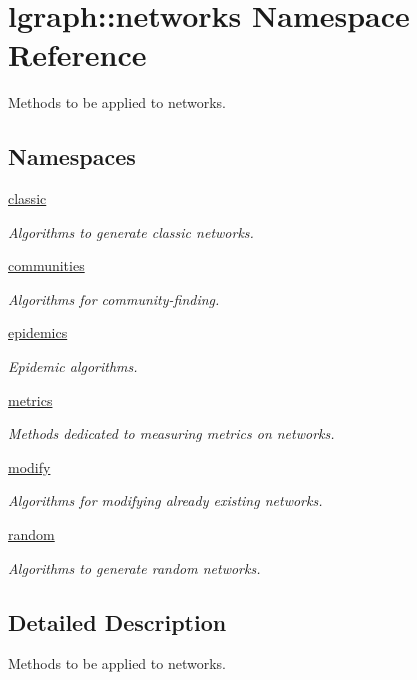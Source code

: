 \hypertarget{namespacelgraph_1_1networks}{\section{lgraph\-:\-:networks Namespace Reference}
\label{namespacelgraph_1_1networks}
}


Methods to be applied to networks.  


\subsection*{Namespaces}
\begin{DoxyCompactItemize}
\item 
\hyperlink{namespacelgraph_1_1networks_1_1classic}{classic}
\begin{DoxyCompactList}\small\item\em Algorithms to generate classic networks. \end{DoxyCompactList}\item 
\hyperlink{namespacelgraph_1_1networks_1_1communities}{communities}
\begin{DoxyCompactList}\small\item\em Algorithms for community-\/finding. \end{DoxyCompactList}\item 
\hyperlink{namespacelgraph_1_1networks_1_1epidemics}{epidemics}
\begin{DoxyCompactList}\small\item\em Epidemic algorithms. \end{DoxyCompactList}\item 
\hyperlink{namespacelgraph_1_1networks_1_1metrics}{metrics}
\begin{DoxyCompactList}\small\item\em Methods dedicated to measuring metrics on networks. \end{DoxyCompactList}\item 
\hyperlink{namespacelgraph_1_1networks_1_1modify}{modify}
\begin{DoxyCompactList}\small\item\em Algorithms for modifying already existing networks. \end{DoxyCompactList}\item 
\hyperlink{namespacelgraph_1_1networks_1_1random}{random}
\begin{DoxyCompactList}\small\item\em Algorithms to generate random networks. \end{DoxyCompactList}\end{DoxyCompactItemize}


\subsection{Detailed Description}
Methods to be applied to networks. 